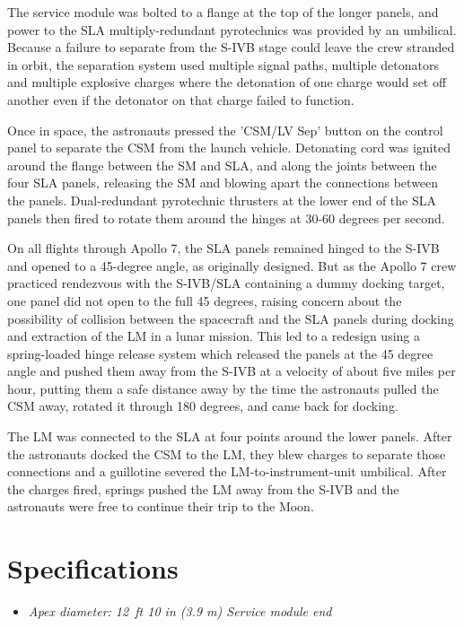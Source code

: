 The service module was bolted to a flange at the top of the longer
panels, and power to the SLA multiply-redundant pyrotechnics was
provided by an umbilical. Because a failure to separate from the S-IVB
stage could leave the crew stranded in orbit, the separation system used
multiple signal paths, multiple detonators and multiple explosive
charges where the detonation of one charge would set off another even if
the detonator on that charge failed to function.

Once in space, the astronauts pressed the 'CSM/LV Sep' button on the
control panel to separate the CSM from the launch vehicle. Detonating
cord was ignited around the flange between the SM and SLA, and along the
joints between the four SLA panels, releasing the SM and blowing apart
the connections between the panels. Dual-redundant pyrotechnic thrusters
at the lower end of the SLA panels then fired to rotate them around the
hinges at 30-60 degrees per second.

On all flights through Apollo 7, the SLA panels remained hinged to the
S-IVB and opened to a 45-degree angle, as originally designed. But as
the Apollo 7 crew practiced rendezvous with the S-IVB/SLA containing a
dummy docking target, one panel did not open to the full 45 degrees,
raising concern about the possibility of collision between the
spacecraft and the SLA panels during docking and extraction of the LM in
a lunar mission. This led to a redesign using a spring-loaded hinge
release system which released the panels at the 45 degree angle and
pushed them away from the S-IVB at a velocity of about five miles per
hour, putting them a safe distance away by the time the astronauts
pulled the CSM away, rotated it through 180 degrees, and came back for
docking.

The LM was connected to the SLA at four points around the lower panels.
After the astronauts docked the CSM to the LM, they blew charges to
separate those connections and a guillotine severed the
LM-to-instrument-unit umbilical. After the charges fired, springs pushed
the LM away from the S-IVB and the astronauts were free to continue
their trip to the Moon.

\section{Specifications}\label{specifications}

\begin{itemize}
\item
  \emph{Apex diameter: 12~ft 10 in (3.9 m) Service module end}
\end{itemize}

